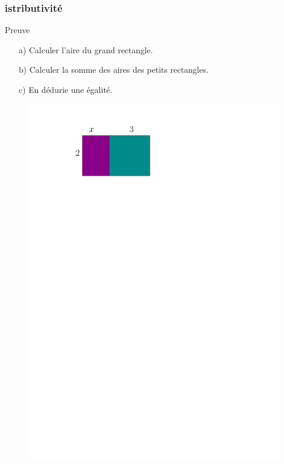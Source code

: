 \documentclass{beamer}
\begin{document}
\begin{frame}
  \frametitle{ istributivité}

 \begin{block}{Preuve}
   \begin{enumerate}
   \item[a)] Calculer l'aire du grand rectangle.
   \item[b)] Calculer la somme des aires des petits rectangles.
   \item[c)] En dédurie une égalité.
   \end{enumerate}
 \end{block}

  \begin{figure}[H]
    \centering
    \includegraphics[width=0.6\linewidth]{sources/1/simple-distri.pdf}
  \end{figure}
\end{frame}
\end{document}

